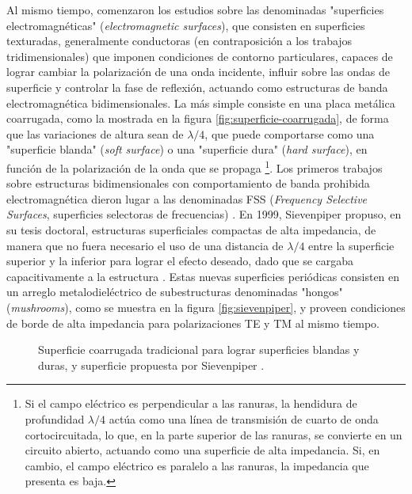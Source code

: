 Al mismo tiempo, comenzaron los estudios sobre las denominadas "superficies electromagnéticas" (\textit{electromagnetic surfaces}), que consisten en superficies texturadas, generalmente conductoras (en contraposición a los trabajos tridimensionales) que imponen condiciones de contorno particulares, capaces de lograr cambiar la polarización de una onda incidente, influir sobre las ondas de superficie y controlar la fase de reflexión, actuando como estructuras de banda electromagnética bidimensionales. La más simple consiste en una placa metálica coarrugada, como la mostrada en la figura \ref{fig:superficie-coarrugada}, de forma que las variaciones de altura sean de $\lambda/4$, que puede comportarse como una "superficie blanda" (\textit{soft surface}) o una "superficie dura" (\textit{hard surface}), en función de la polarización de la onda que se propaga \footnote{Si el campo eléctrico es perpendicular a las ranuras, la hendidura de profundidad $\lambda/4$ actúa como una línea de transmisión de cuarto de onda cortocircuitada, lo que, en la parte superior de las ranuras, se convierte en un circuito abierto, actuando como una superficie de alta impedancia. Si, en cambio, el campo eléctrico es paralelo a las ranuras, la impedancia que presenta es baja.}. Los primeros trabajos sobre estructuras bidimensionales con comportamiento de banda prohibida electromagnética dieron lugar a las denominadas FSS (\textit{Frequency Selective Surfaces}, superficies selectoras de frecuencias) \cite{Munk:libro}. En 1999, Sievenpiper \cite{Sievenpiper:Thesis} propuso, en su tesis doctoral, estructuras superficiales compactas de alta impedancia, de manera que no fuera necesario el uso de una distancia de $\lambda/4$ entre la superficie superior y la inferior para lograr el efecto deseado, dado que se cargaba capacitivamente a la estructura \cite{Marcela:Tesis} \cite{Sievenpiper:HIESForbiddenBand}. Estas nuevas superficies periódicas consisten en un arreglo metalodieléctrico de subestructuras denominadas "hongos" (\textit{mushrooms}), como se muestra en la figura \ref{fig:sievenpiper}, y proveen condiciones de borde de alta impedancia para polarizaciones TE y TM al mismo tiempo.

\begin{figure}[H]
	\centering 
	\hspace{30pt}
	\caption{Superficie coarrugada tradicional para lograr superficies blandas y duras, y superficie propuesta por Sievenpiper \cite{Sievenpiper:Thesis}.}
	\label{fig:sievenpiper-comparacion}
\end{figure}

